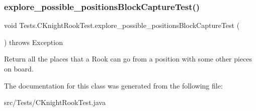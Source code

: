 \subsubsection{\texorpdfstring{explore\+\_\+possible\+\_\+positions\+Block\+Capture\+Test()}{explore\_possible\_positionsBlockCaptureTest()}}
{\footnotesize\ttfamily void Tests.\+C\+Knight\+Rook\+Test.\+explore\+\_\+possible\+\_\+positions\+Block\+Capture\+Test (\begin{DoxyParamCaption}{ }\end{DoxyParamCaption}) throws Exception\hspace{0.3cm}{\ttfamily [inline]}}

Return all the places that a Rook can go from a position with some other pieces on board. 

The documentation for this class was generated from the following file\+:\begin{DoxyCompactItemize}
\item 
src/\+Tests/C\+Knight\+Rook\+Test.\+java\end{DoxyCompactItemize}
